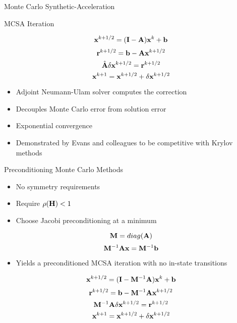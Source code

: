 \documentclass{beamer}
\begin{document}
\begin{frame}{Monte Carlo Synthetic-Acceleration}

  \begin{beamerboxesrounded}[upper=boxheadcolor,lower=boxbodycolor,shadow=true]
    {MCSA Iteration}

    \[
    \mathbf{x}^{k+1/2} = (\mathbf{I} - \mathbf{A})\mathbf{x}^k + \mathbf{b}
    \]
    \[
    \mathbf{r}^{k+1/2} = \mathbf{b} - \mathbf{A}\mathbf{x}^{k+1/2}
    \]
    \[
    \hat{\mathbf{A}}\delta\mathbf{x}^{k+1/2} = \mathbf{r}^{k+1/2}
    \]
    \[
    \mathbf{x}^{k+1} = \mathbf{x}^{k+1/2} + \delta \mathbf{x}^{k+1/2}
    \]

  \end{beamerboxesrounded}

  \begin{itemize}
  \item Adjoint Neumann-Ulam solver computes the correction
  \item Decouples Monte Carlo error from solution error
  \item Exponential convergence
  \item Demonstrated by Evans and colleagues to be competitive with
    Krylov methods
  \end{itemize}

\end{frame}

\begin{frame}{Preconditioning Monte Carlo Methods}

  \begin{itemize}
    \item No symmetry requirements
    \item Require $\rho(\mathbf{H}) < 1$
    \item Choose Jacobi preconditioning at a minimum
  \end{itemize}

  \[
  \mathbf{M} = diag(\mathbf{A})
  \]
  \[
  \mathbf{M}^{-1}\mathbf{A}\mathbf{x} = \mathbf{M}^{-1}\mathbf{b}
  \]
  
  \begin{itemize}
  \item Yields a preconditioned MCSA iteration with no in-state
    transitions
  \end{itemize}

  \[
  \mathbf{x}^{k+1/2} = (\mathbf{I} - \mathbf{M}^{-1}\mathbf{A})\mathbf{x}^k + \mathbf{b}
  \]
  \[
  \mathbf{r}^{k+1/2} = \mathbf{b} - \mathbf{M}^{-1}\mathbf{A}\mathbf{x}^{k+1/2}
  \]
  \[
  \mathbf{M}^{-1}\mathbf{A}\delta\mathbf{x}^{k+1/2} = \mathbf{r}^{k+1/2}
  \]
  \[
  \mathbf{x}^{k+1} = \mathbf{x}^{k+1/2} + \delta \mathbf{x}^{k+1/2}
  \]

\end{frame}
\end{document}
